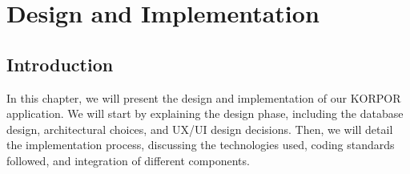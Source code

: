 \chapter{Design and Implementation}

\section{Introduction}

In this chapter, we will present the design and implementation of our KORPOR application. We will start by explaining the design phase, including the database design, architectural choices, and UX/UI design decisions. Then, we will detail the implementation process, discussing the technologies used, coding standards followed, and integration of different components.


